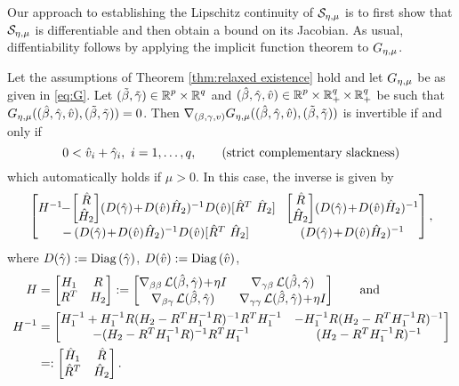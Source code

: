 Our approach to establishing the Lipschitz continuity of $\mathcal{S}_{\eta,\mu}$ is to 
first show that $\mathcal{S}_{\eta,\mu}$ is differentiable and then obtain a bound on its Jacobian.
As usual, diffentiability follows by applying the implicit function theorem to 
$G_{\eta,\mu}$.

\begin{lemma}\label{lem:invert}
Let the assumptions of Theorem \ref{thm:relaxed existence} hold and let
$G_{\eta,\mu}$ be as given in \eqref{eq:G}.
Let 
$(\tilde\beta,{\tilde{\gamma}})\in{\operatorname{\mathbb{R}}^p}\times{\operatorname{\mathbb{R}}^q}$ and  
$(\hat{\beta}, {\hat{\gamma}},{\hat v})\in{\operatorname{\mathbb{R}}^p}\times\operatorname{\mathbb{R}}_+^q\times\operatorname{\mathbb{R}}_+^q$ be such that
$G_{\eta,\mu}((\hat{\beta}, {\hat{\gamma}},{\hat v}),(\tilde\beta,{\tilde{\gamma}}))=0$. 
Then $\nabla_{(\beta, \gamma,v)}G_{\eta,\mu}((\hat{\beta}, {\hat{\gamma}},{\hat v}),(\tilde\beta,{\tilde{\gamma}}))$
is invertible if and only if
\begin{equation}\label{eq:str cs}
0<{\hat v}_i+{\hat{\gamma}}_i,\ i=1,\dots,q,\qquad\mbox{(strict complementary slackness)}
\end{equation}
which automatically holds if $\mu>0$.
In this case, the inverse is given by
\begin{equation}\label{eq:grad G inv}
\begin{bmatrix}
H^{-1}\!\!-\!\begin{bmatrix}\hat R\\ \hat H_2\end{bmatrix}\!
(D(\hgam)\!+\!D(\hv)\hat H_2)^{-1}D(\hv)[\hat R^T\ \hat H_2]
& 
\!\begin{bmatrix}\hat R\\ \hat H_2\end{bmatrix}\!(D(\hgam)\!+\!D(\hv)\hat H_2)^{-1}
\\
\!-\,(D(\hgam)\!+\!D(\hv)\hat H_2)^{-1}D(\hv)[\hat R^T\ \hat H_2]
&\!
(D(\hgam)\!+\!D(\hv)\hat H_2)^{-1}
\end{bmatrix},
\end{equation}
where $D({\hat{\gamma}}):=\mathrm{Diag}\left({\hat{\gamma}}\right)$, $D({\hat v}):=\mathrm{Diag}\left({\hat v}\right)$, 
\[
\begin{aligned}
H&=
\begin{bmatrix}
H_1&R\\ R^T& H_2
\end{bmatrix}
:=\begin{bmatrix}
\nabla_{\beta\beta}\operatorname{\mathcal{L}}(\hat{\beta},{\hat{\gamma}})\!+\!\eta I&\nabla_{\gamma\beta}\operatorname{\mathcal{L}}(\hat{\beta},{\hat{\gamma}})
\\
\nabla_{\beta\gamma}\operatorname{\mathcal{L}}(\hat{\beta},{\hat{\gamma}})&\nabla_{\gamma\gamma}\operatorname{\mathcal{L}}(\hat{\beta},{\hat{\gamma}})
\!+\!\eta I
\end{bmatrix}\qquad\text{and}
\\
H^{-1}&=
\begin{bmatrix}
H_1^{-1}+H_1^{-1}R(H_2-R^TH_1^{-1}R)^{-1}R^TH_1^{-1}& -H_1^{-1}R(H_2-R^TH_1^{-1}R)^{-1}
\\
-(H_2-R^TH_1^{-1}R)^{-1}R^TH_1^{-1}&(H_2-R^TH_1^{-1}R)^{-1}
\end{bmatrix}
\\
&=:
\begin{bmatrix}
\hat H_1&\hat R\\ \hat R^T& \hat H_2
\end{bmatrix}.
\end{aligned}
\]
\end{lemma}
